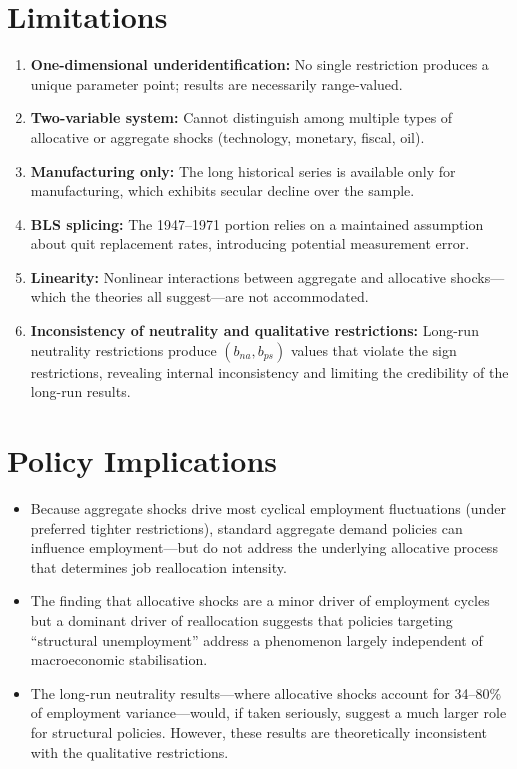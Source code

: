 \section{Limitations}

\begin{enumerate}
  \item \textbf{One-dimensional underidentification:} No single restriction
    produces a unique parameter point; results are necessarily range-valued.
  \item \textbf{Two-variable system:} Cannot distinguish among multiple types
    of allocative or aggregate shocks (technology, monetary, fiscal, oil).
  \item \textbf{Manufacturing only:} The long historical series is available
    only for manufacturing, which exhibits secular decline over the sample.
  \item \textbf{BLS splicing:} The 1947--1971 portion relies on a maintained
    assumption about quit replacement rates, introducing potential measurement
    error.
  \item \textbf{Linearity:} Nonlinear interactions between aggregate and
    allocative shocks---which the theories all suggest---are not accommodated.
  \item \textbf{Inconsistency of neutrality and qualitative restrictions:}
    Long-run neutrality restrictions produce $(b_{na}, b_{ps})$ values that
    violate the sign restrictions, revealing internal inconsistency and
    limiting the credibility of the long-run results.
\end{enumerate}

\section{Policy Implications}

\begin{itemize}
  \item Because aggregate shocks drive most cyclical employment fluctuations
    (under preferred tighter restrictions), standard aggregate demand policies
    can influence employment---but do not address the underlying allocative
    process that determines job reallocation intensity.
  \item The finding that allocative shocks are a minor driver of employment
    cycles but a dominant driver of reallocation suggests that policies
    targeting ``structural unemployment'' address a phenomenon largely
    independent of macroeconomic stabilisation.
  \item The long-run neutrality results---where allocative shocks account for
    34--80\% of employment variance---would, if taken seriously, suggest a
    much larger role for structural policies. However, these results are
    theoretically inconsistent with the qualitative restrictions.
\end{itemize}


